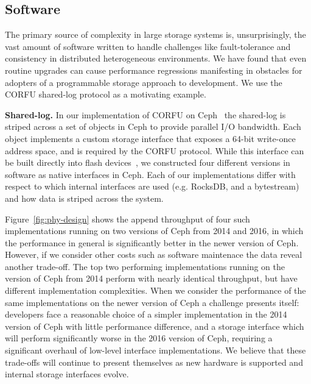 \subsection{Software}

The primary source of complexity in large storage systems is, unsurprisingly,
the vast amount of software written to handle challenges like fault-tolerance
and consistency in distributed heterogeneous environments. We have found that
even routine upgrades can cause performance regressions manifesting in obstacles 
for adopters of a programmable storage approach to development. We use the
CORFU shared-log protocol as a motivating example.

{\bf Shared-log.} In our implementation of CORFU on Ceph~\cite{zlog} the shared-log is striped
across a set of objects in Ceph to provide parallel I/O bandwidth. Each object
implements a custom storage interface that exposes a 64-bit write-once address
space, and is required by the CORFU protocol.  While this interface can be
built directly into flash devices~\cite{wei:systor13}, we constructed four
different versions in software as native interfaces in Ceph. Each of our
implementations differ with respect to which internal interfaces are used
(e.g. RocksDB, and a bytestream) and how data is striped across the system.

Figure~\ref{fig:phy-design} shows the append throughput of four such
implementations running on two versions of Ceph from 2014 and 2016, in which
the performance in general is significantly better in the newer version of
Ceph. However, if we consider other costs such as software maintenace the data
reveal another trade-off. The top two performing implementations running on
the version of Ceph from 2014 perform with nearly identical throughput, but
have different implementation complexities. When we consider the performance
of the same implementations on the newer version of Ceph a challenge presents
itself: developers face a reasonable choice of a simpler implementation in the
2014 version of Ceph with little performance difference, and a storage
interface which will perform significantly worse in the 2016 version of Ceph,
requiring a significant overhaul of low-level interface implementations. We
believe that these trade-offs will continue to present themselves as new
hardware is supported and internal storage interfaces evolve.

